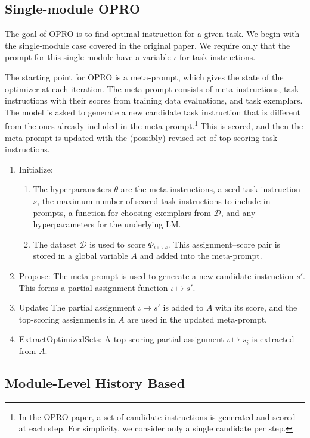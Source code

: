 \subsection{Single-module OPRO}

The goal of OPRO is to find optimal instruction for a given task. We begin with the single-module case covered in the original paper. We require only that the prompt for this single module have a variable $\iota$ for task instructions.

The starting point for OPRO is a meta-prompt, which gives the state of the optimizer at each iteration. The meta-prompt consists of meta-instructions, task instructions with their scores from training data evaluations, and task exemplars. The model is asked to generate a new candidate task instruction that is different from the ones already included in the meta-prompt.\footnote{In the OPRO paper, a set of candidate instructions is generated and scored at each step. For simplicity, we consider only a single candidate per step.} This is scored, and then the meta-prompt is updated with the (possibly) revised set of top-scoring task instructions.

\begin{enumerate}
\item Initialize: 
\begin{enumerate}
\item The hyperparameters $\theta$ are the meta-instructions, a seed task instruction $s$, the maximum number of scored task instructions to include in prompts,  a function for choosing exemplars from $\mathcal{D}$, and any hyperparameters for the underlying LM.
\item The dataset $\mathcal{D}$ is used to score $\Phi_{\iota\mapsto s}$. This assignment--score pair is stored in a global variable $A$ and added into the meta-prompt.
\end{enumerate}
\item Propose: The meta-prompt is used to generate a new candidate instruction $s'$. This forms a partial assignment function $\iota \mapsto s'$.
\item Update: The partial assignment $\iota \mapsto s'$ is added to $A$ with its score, and the 
top-scoring assignments in $A$ are used in the updated meta-prompt.
\item ExtractOptimizedSets: A top-scoring partial assignment $\iota \mapsto s_{i}$ is extracted from $A$.
\end{enumerate}


\subsection{Module-Level History Based}


